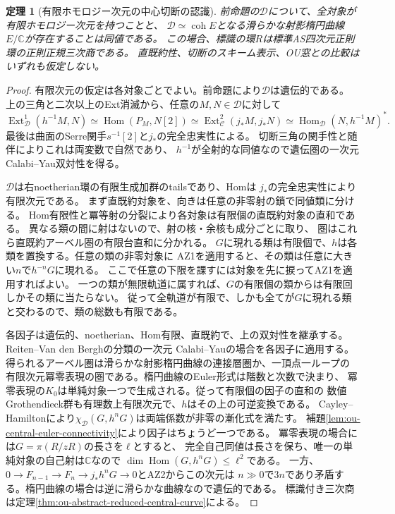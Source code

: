 \documentclass[11pt,a4paper]{ltjsarticle}
\newtheorem{theorem}{定理}[section]
\theoremstyle{definition}
\newcommand{\coh}{\operatorname{coh}}
\begin{document}
\begin{theorem}[有限ホモロジー次元の中心切断の認識]
\label{thm:ou-hereditary-central-slice}
前命題の$\mathcal D$について、全対象が有限ホモロジー次元を持つことと、
$\mathcal D\simeq\coh E$となる滑らかな射影楕円曲線$E/\mathbb C$が存在することは同値である。
この場合、標識の環$R$は標準AS四次元正則環の正則正規三次商である。
直既約性、切断のスキーム表示、OU窓との比較はいずれも仮定しない。
\end{theorem}
\begin{proof}
有限次元の仮定は各対象ごとでよい。前命題により$\mathcal D$は遺伝的である。
上の三角と二次以上のExt消滅から、任意の$M,N\in\mathcal D$に対して
\[
 \operatorname{Ext}^1_{\mathcal D}(h^{-1}M,N)
 \simeq\operatorname{Hom}(P_M,N[2])
 \simeq\operatorname{Ext}^2_{\mathcal C}(j_*M,j_*N)
 \simeq\operatorname{Hom}_{\mathcal D}(N,h^{-1}M)^* .
\]
最後は曲面のSerre関手$s^{-1}[2]$と$j_*$の完全忠実性による。
切断三角の関手性と随伴によりこれは両変数で自然であり、
$h^{-1}$が全射的な同値なので遺伝圏の一次元Calabi--Yau双対性を得る。

$\mathcal D$は右noetherian環の有限生成加群のtailsであり、Homは
$j_*$の完全忠実性により有限次元である。
まず直既約対象を、向きは任意の非零射の鎖で同値類に分ける。
Hom有限性と冪等射の分裂により各対象は有限個の直既約対象の直和である。
異なる類の間に射はないので、射の核・余核も成分ごとに取り、
圏はこれら直既約アーベル圏の有限台直和に分かれる。
$G$に現れる類は有限個で、$h$は各類を置換する。任意の類の非零対象に
AZ1を適用すると、その類は任意に大きい$n$で$h^{-n}G$に現れる。
ここで任意の下限を課すには対象を先に捩ってAZ1を適用すればよい。
一つの類が無限軌道に属すれば、$G$の有限個の類からは有限回しかその類に当たらない。
従って全軌道が有限で、しかも全てが$G$に現れる類と交わるので、類の総数も有限である。

各因子は遺伝的、noetherian、Hom有限、直既約で、上の双対性を継承する。
Reiten--Van den Berghの分類\cite[Theorem~C]{RVdB2002}の一次元
Calabi--Yauの場合\cite[Theorem~4.2]{BrueningBurban2005}を各因子に適用する。
得られるアーベル圏は滑らかな射影楕円曲線の連接層圏か、一頂点一ループの
有限次元冪零表現の圏である。楕円曲線のEuler形式は階数と次数で決まり、
冪零表現の$K_0$は単純対象一つで生成される。従って有限個の因子の直和の
数値Grothendieck群も有理数上有限次元で、$h$はその上の可逆変換である。
Cayley--Hamiltonにより$\chi_{\mathcal D}(G,h^nG)$は両端係数が非零の漸化式を満たす。
補題\ref{lem:ou-central-euler-connectivity}により因子はちょうど一つである。
冪零表現の場合には$G=\pi(R/zR)$の長さを$\ell$とすると、
完全自己同値は長さを保ち、唯一の単純対象の自己射は$\mathbb C$なので
$\dim\operatorname{Hom}(G,h^nG)\le\ell^2$である。
一方、$0\to F_{n-1}\to F_n\to j_*h^nG\to0$とAZ2からこの次元は
$n\gg0$で$3n$であり矛盾する。楕円曲線の場合は逆に滑らかな曲線なので遺伝的である。
標識付き三次商は定理\ref{thm:ou-abstract-reduced-central-curve}による。

\end{proof}
\end{document}
